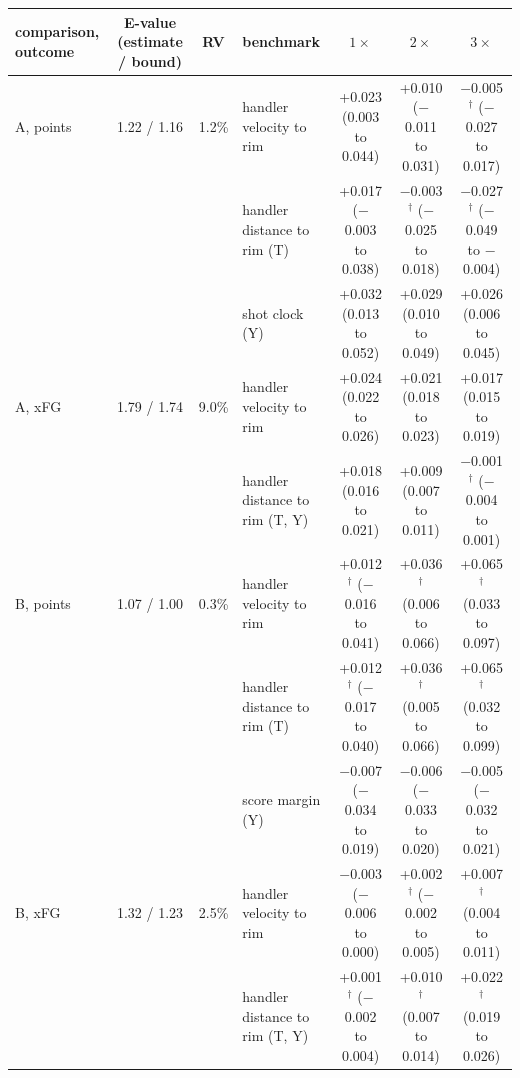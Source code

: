 \begin{tabular}{lcclccc}
\hline
comparison, outcome & E-value (estimate / bound) & RV & benchmark & $1\times$ & $2\times$ & $3\times$ \\
\hline
A, points & 1.22 / 1.16 & 1.2\% & handler velocity to rim & +0.023 (0.003 to 0.044) & +0.010 ($-$0.011 to 0.031) & $-$0.005$^\dagger$ ($-$0.027 to 0.017) \\
 &  &  & handler distance to rim (T) & +0.017 ($-$0.003 to 0.038) & $-$0.003$^\dagger$ ($-$0.025 to 0.018) & $-$0.027$^\dagger$ ($-$0.049 to $-$0.004) \\
 &  &  & shot clock (Y) & +0.032 (0.013 to 0.052) & +0.029 (0.010 to 0.049) & +0.026 (0.006 to 0.045) \\
A, xFG & 1.79 / 1.74 & 9.0\% & handler velocity to rim & +0.024 (0.022 to 0.026) & +0.021 (0.018 to 0.023) & +0.017 (0.015 to 0.019) \\
 &  &  & handler distance to rim (T, Y) & +0.018 (0.016 to 0.021) & +0.009 (0.007 to 0.011) & $-$0.001$^\dagger$ ($-$0.004 to 0.001) \\
B, points & 1.07 / 1.00 & 0.3\% & handler velocity to rim & +0.012$^\dagger$ ($-$0.016 to 0.041) & +0.036$^\dagger$ (0.006 to 0.066) & +0.065$^\dagger$ (0.033 to 0.097) \\
 &  &  & handler distance to rim (T) & +0.012$^\dagger$ ($-$0.017 to 0.040) & +0.036$^\dagger$ (0.005 to 0.066) & +0.065$^\dagger$ (0.032 to 0.099) \\
 &  &  & score margin (Y) & $-$0.007 ($-$0.034 to 0.019) & $-$0.006 ($-$0.033 to 0.020) & $-$0.005 ($-$0.032 to 0.021) \\
B, xFG & 1.32 / 1.23 & 2.5\% & handler velocity to rim & $-$0.003 ($-$0.006 to 0.000) & +0.002$^\dagger$ ($-$0.002 to 0.005) & +0.007$^\dagger$ (0.004 to 0.011) \\
 &  &  & handler distance to rim (T, Y) & +0.001$^\dagger$ ($-$0.002 to 0.004) & +0.010$^\dagger$ (0.007 to 0.014) & +0.022$^\dagger$ (0.019 to 0.026) \\
\hline
\end{tabular}
\par{}
